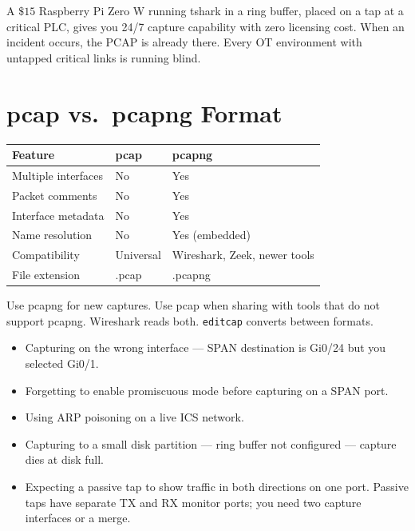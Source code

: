 \documentclass[12pt,twoside,openright]{memoir}
\begin{document}
\begin{fieldnote}
A $\$15$ Raspberry Pi Zero W running tshark in a ring buffer, placed on a tap at a critical PLC, gives you 24/7 capture capability with zero licensing cost. When an incident occurs, the PCAP is already there. Every OT environment with untapped critical links is running blind.
\end{fieldnote}

\section{pcap vs.\ pcapng Format}

\begin{center}
\begin{tabular}{L{3cm}L{3.5cm}L{4.5cm}}
\toprule
{}
\textbf{Feature} & \textbf{pcap} & \textbf{pcapng} \\
\midrule
Multiple interfaces & No & Yes \\
Packet comments & No & Yes \\
Interface metadata & No & Yes \\
Name resolution & No & Yes (embedded) \\
Compatibility & Universal & Wireshark, Zeek, newer tools \\
File extension & .pcap & .pcapng \\
\bottomrule
\end{tabular}
\end{center}

Use pcapng for new captures. Use pcap when sharing with tools that do not support pcapng. Wireshark reads both. \texttt{editcap} converts between formats.

\begin{commonmistakes}
\begin{itemize}[noitemsep]
  \item Capturing on the wrong interface --- SPAN destination is Gi0/24 but you selected Gi0/1.
  \item Forgetting to enable promiscuous mode before capturing on a SPAN port.
  \item Using ARP poisoning on a live ICS network.
  \item Capturing to a small disk partition --- ring buffer not configured --- capture dies at disk full.
  \item Expecting a passive tap to show traffic in both directions on one port. Passive taps have separate TX and RX monitor ports; you need two capture interfaces or a merge.
\end{itemize}
\end{commonmistakes}
\end{document}
